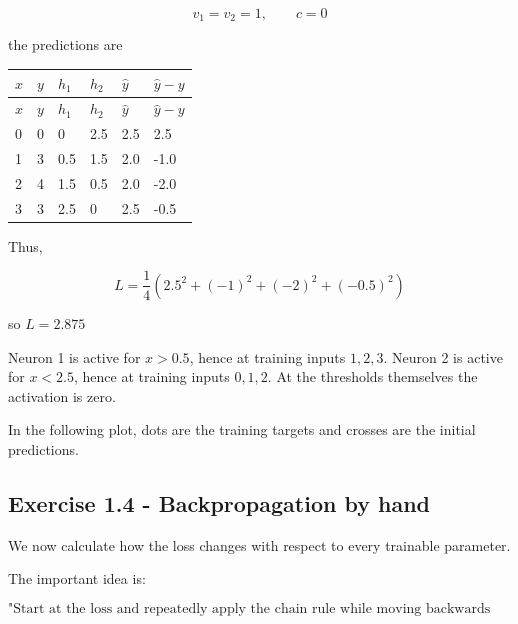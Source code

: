 \documentclass[10pt]{article}
\begin{document}
\[
v_1=v_2=1,
\qquad
c=0
\]

the predictions are

\begingroup
\small
\setlength{\tabcolsep}{4pt}
\begin{longtable}{l|l|l|l|l|l}
$x$ & $y$ & $h_1$ & $h_2$ & $\hat y$ & $\hat y-y$ \\[1.5pt]
\hline
\endfirsthead
$x$ & $y$ & $h_1$ & $h_2$ & $\hat y$ & $\hat y-y$ \\[1.5pt]
\hline
\endhead
0 & 0 & 0 & 2.5 & 2.5 & 2.5 \\[1.5pt]
1 & 3 & 0.5 & 1.5 & 2.0 & -1.0 \\[1.5pt]
2 & 4 & 1.5 & 0.5 & 2.0 & -2.0 \\[1.5pt]
3 & 3 & 2.5 & 0 & 2.5 & -0.5 \\[1.5pt]
\end{longtable}
\endgroup
Thus,

\[
L=\frac{1}{4}\left(2.5^2+(-1)^2+(-2)^2+(-0.5)^2\right)
\]

so $L=2.875$


Neuron 1 is active for $x>0.5$, hence at training inputs $1,2,3$. Neuron 2 is active for $x<2.5$, hence at training inputs $0,1,2$. At the thresholds themselves the activation is zero.

In the following plot, dots are the training targets and crosses are the initial predictions.
\begin{center}
\end{center}
\par\endgroup

\subsection*{Exercise 1.4 - Backpropagation by hand}
We now calculate how the loss changes with respect to every trainable parameter.

The important idea is:

\[
\text{"Start at the loss and repeatedly apply the chain rule while moving backwards through the network"}
\]
\end{document}
